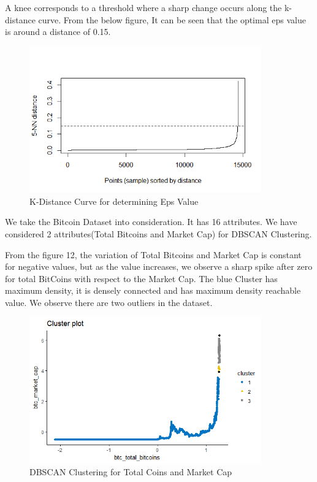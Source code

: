 \documentclass{article}
\begin{document}
A knee corresponds to a threshold where a sharp change occurs along the k-distance curve. From the below figure, It can be seen that the optimal eps value is around a distance of 0.15.
\newpage

\begin{figure}[h]
    \centering
    \includegraphics[width=10cm]{epswith2attrFig5.png}
    \caption{K-Distance Curve for determining Eps Value }
    \label{fig:my_label}
\end{figure}

We take the Bitcoin Dataset into consideration. It has 16 attributes. We have considered 2 attributes(Total Bitcoins and Market Cap) for DBSCAN Clustering.\newline

From the figure 12, the variation of Total Bitcoins and Market Cap is constant for negative values, but as the value increases, we observe a sharp spike after zero for total BitCoins with respect to the Market Cap. The blue Cluster has maximum density, it is densely connected and has maximum density reachable value. We observe there are two outliers in the dataset. \newline


\begin{figure}[h]
    \centering
    \includegraphics[width=10cm]{PlotMarCapTotCoinsFig6.png}
    \caption{DBSCAN Clustering for Total Coins and Market Cap }
    \label{fig:my_label}
\end{figure}
\end{document}
